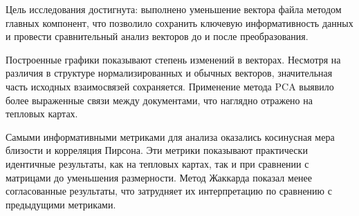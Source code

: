 
Цель исследования достигнута: выполнено уменьшение вектора файла методом главных компонент, 
что позволило сохранить ключевую информативность данных и провести сравнительный анализ векторов до и после преобразования.

Построенные графики показывают степень изменений в векторах. 
Несмотря на различия в структуре нормализированных и обычных векторов, значительная часть исходных взаимосвязей сохраняется. 
Применение метода PCA выявило более выраженные связи между документами, что наглядно отражено на тепловых картах.

Самыми информативными метриками для анализа оказались косинусная мера близости и корреляция Пирсона. 
Эти метрики показывают практически идентичные результаты, как на тепловых картах, так и при сравнении с матрицами до уменьшения размерности. 
Метод Жаккарда показал менее согласованные результаты, что затрудняет их интерпретацию по сравнению с предыдущими метриками.